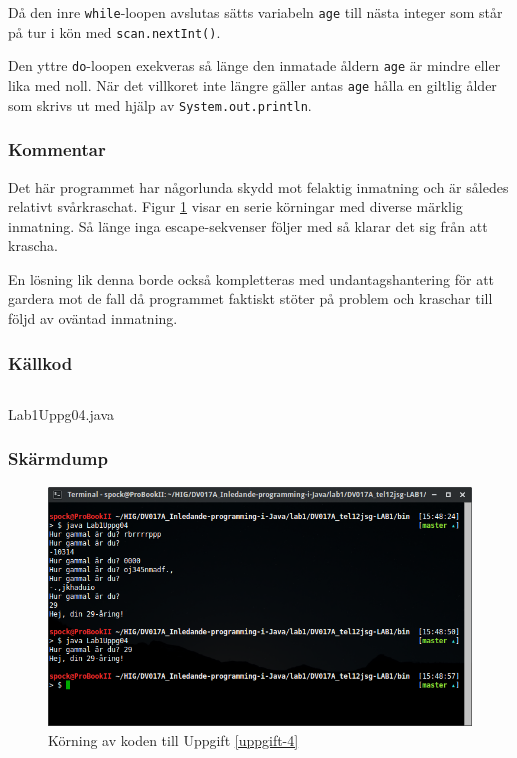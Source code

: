 Då den inre \texttt{while}-loopen avslutas sätts variabeln \texttt{age} till 
nästa integer som står på tur i kön med \texttt{scan.nextInt()}.
\par Den yttre \texttt{do}-loopen exekveras så länge den inmatade åldern \texttt{age}
är mindre eller lika med noll. När det villkoret inte längre gäller antas \texttt{age}
hålla en giltlig ålder som skrivs ut med hjälp av \texttt{System.out.println}.

\subsubsection{Kommentar}
Det här programmet har någorlunda skydd mot felaktig inmatning och är således
relativt svårkraschat. Figur \ref{fig:screenshot-04} visar en serie körningar
med diverse märklig inmatning. Så länge inga escape-sekvenser följer med så
klarar det sig från att krascha.
\par En lösning lik denna borde också kompletteras med undantagshantering för att
gardera mot de fall då programmet faktiskt stöter på problem och kraschar till
följd av oväntad inmatning.

\subsubsection{Källkod}\label{uppgift-4_src}
    \inputminted[linenos]{java}{src/Lab1Uppg04.java}
    \caption{Lab1Uppg04.java}
    \label{Uppg4src}

\subsubsection{Skärmdump}
\begin{figure}[htbp]
    \centering
        \includegraphics[width=\linewidth]{img/04.png}
    \caption{Körning av koden till Uppgift \ref{uppgift-4}}
    \label{fig:screenshot-04}
\end{figure}

